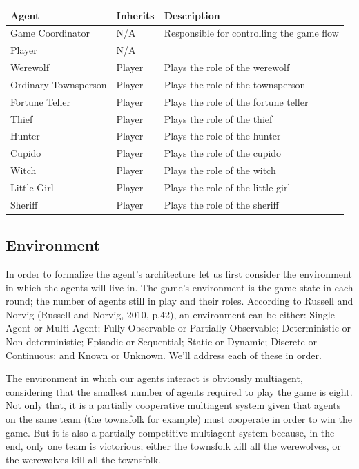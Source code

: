 \documentclass{article}
\begin{document}
\begin{center}
	\begin{tabular}{ p{3cm} l p{5cm} }
	Agent & Inherits & Description \\
	\hline
	Game Coordinator & N/A & Responsible for controlling the game flow\\
	Player & N/A \\
	Werewolf & Player & Plays the role of the werewolf \\
	Ordinary Townsperson & Player & Plays the role of the townsperson \\
	Fortune Teller & Player & Plays the role of the fortune teller \\
	Thief & Player & Plays the role of the thief \\
	Hunter & Player & Plays the role of the hunter \\
	Cupido & Player & Plays the role of the cupido \\
	Witch & Player & Plays the role of the witch \\
	Little Girl & Player & Plays the role of the little girl \\
	Sheriff & Player & Plays the role of the sheriff \\
	\end{tabular}
\end{center}

\subsection{Environment}
In order to formalize the agent's architecture let us first consider the environment in which the agents will live in. The game's environment is the game state in each round; the number of agents still in play and their roles. According to Russell and Norvig (Russell and Norvig, 2010, p.42), an environment can be either: Single-Agent or Multi-Agent; Fully Observable or Partially Observable; Deterministic or Non-deterministic; Episodic or Sequential; Static or Dynamic; Discrete or Continuous; and Known or Unknown. We'll address each of these in order.

The environment in which our agents interact is obviously multiagent, considering that the smallest number of agents required to play the game is eight. Not only that, it is a partially cooperative multiagent system given that agents on the same team (the townsfolk for example) must cooperate in order to win the game. But it is also a partially competitive multiagent system because, in the end, only one team is victorious; either the townsfolk kill all the werewolves, or the werewolves kill all the townsfolk.
\end{document}
